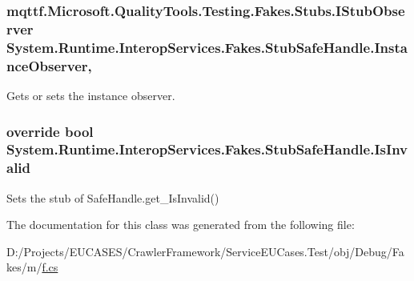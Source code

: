\hypertarget{class_system_1_1_runtime_1_1_interop_services_1_1_fakes_1_1_stub_safe_handle_ad54746a6cf687f9c1256b523e9a13e6f}{
\subsubsection[{Instance\-Observer}]{\setlength{\rightskip}{0pt plus 5cm}mqttf.\-Microsoft.\-Quality\-Tools.\-Testing.\-Fakes.\-Stubs.\-I\-Stub\-Observer System.\-Runtime.\-Interop\-Services.\-Fakes.\-Stub\-Safe\-Handle.\-Instance\-Observer\hspace{0.3cm}{\ttfamily [get]}, {\ttfamily [set]}}}\label{class_system_1_1_runtime_1_1_interop_services_1_1_fakes_1_1_stub_safe_handle_ad54746a6cf687f9c1256b523e9a13e6f}


Gets or sets the instance observer.

\hypertarget{class_system_1_1_runtime_1_1_interop_services_1_1_fakes_1_1_stub_safe_handle_a36915befa44075aa54ab1de603f18e32}{
\subsubsection[{Is\-Invalid}]{\setlength{\rightskip}{0pt plus 5cm}override bool System.\-Runtime.\-Interop\-Services.\-Fakes.\-Stub\-Safe\-Handle.\-Is\-Invalid\hspace{0.3cm}{\ttfamily [get]}}}\label{class_system_1_1_runtime_1_1_interop_services_1_1_fakes_1_1_stub_safe_handle_a36915befa44075aa54ab1de603f18e32}


Sets the stub of Safe\-Handle.\-get\-\_\-\-Is\-Invalid()



The documentation for this class was generated from the following file\-:\begin{DoxyCompactItemize}
\item 
D\-:/\-Projects/\-E\-U\-C\-A\-S\-E\-S/\-Crawler\-Framework/\-Service\-E\-U\-Cases.\-Test/obj/\-Debug/\-Fakes/m/\hyperlink{m_2f_8cs}{f.\-cs}\end{DoxyCompactItemize}
